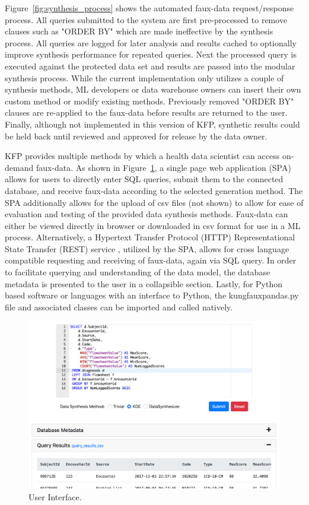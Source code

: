 \documentclass{amia}
\begin{document}
Figure~\ref{fig:synthesis_process} shows the automated faux-data request/response process. All queries submitted to the system are first pre-processed to remove clauses such as "ORDER BY" which are made ineffective by the synthesis process. All queries are logged for later analysis and results cached to optionally improve synthesis performance for repeated queries. Next the processed query is executed against the protected data set and results are passed into the modular synthesis process. While the current implementation only utilizes a couple of synthesis methods, ML developers or data warehouse owners can insert their own custom method or modify existing methods. Previously removed "ORDER BY" clauses are re-applied to the faux-data before results are returned to the user. Finally, although not implemented in this version of KFP, synthetic results could be held back until reviewed and approved for release by the data owner.

KFP provides multiple methods by which a health data scientist can access on-demand faux-data. As shown in Figure~\ref{fig:ui}, a single page web application (SPA) allows for users to directly enter SQL queries, submit them to the connected database, and receive faux-data according to the selected generation method. The SPA additionally allows for the upload of csv files (not shown) to allow for ease of evaluation and testing of the provided data synthesis methods. Faux-data can either be viewed directly in browser or downloaded in csv format for use in a ML process. Alternatively, a Hypertext Transfer Protocol (HTTP) Representational State Transfer (REST) service \cite{w3c_working_group_webservices}, utilized by the SPA, allows for cross language compatible requesting and receiving of faux-data, again via SQL query. In order to facilitate querying and understanding of the data model, the database metadata is presented to the user in a collapsible section. Lastly, for Python based software or languages with an interface to Python, the kungfauxpandas.py file and associated classes can be imported and called natively.

\begin{figure}[ht]
  \centering
  \includegraphics[width=\textwidth]{ui_screenshot3}
  \caption{User Interface.}
  \label{fig:ui}
\end{figure}
\end{document}
